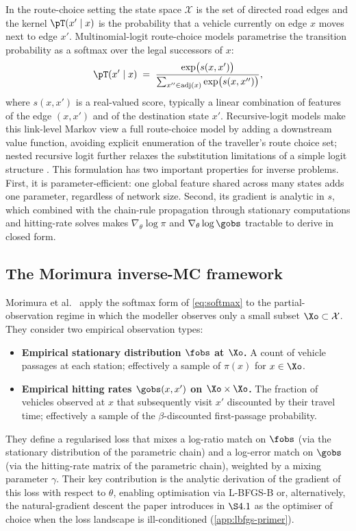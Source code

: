 In the route-choice setting the state space $\mathcal{X}$ is the set of
directed road edges and the kernel
$\pT(x'\mid x)$ is the probability that a vehicle currently on edge $x$
moves next to edge $x'$. Multinomial-logit route-choice models
\cite{ben-akiva1985, frejinger2007} parametrise the transition
probability as a softmax over the legal successors of $x$:
\begin{equation}
\pT(x'\mid x) \;=\;
\frac{\exp\bigl(s(x, x')\bigr)}{\sum_{x'' \in \mathrm{adj}(x)} \exp\bigl(s(x, x'')\bigr)},
\label{eq:softmax}
\end{equation}
where $s(x, x')$ is a real-valued score, typically a linear combination
of features of the edge $(x, x')$ and of the destination state $x'$.
Recursive-logit models make this link-level Markov view a full
route-choice model by adding a downstream value function, avoiding
explicit enumeration of the traveller's route choice set; nested
recursive logit further relaxes the substitution limitations of a
simple logit structure \cite{fosgerau2013route, mai2015nested}.
This formulation has two important properties for inverse problems.
First, it is parameter-efficient: one global feature shared across
many states adds one parameter, regardless of network size. Second, its
gradient is analytic in $s$, which combined with the chain-rule
propagation through stationary computations and hitting-rate solves makes
$\nabla_\theta \log \pi$ and $\nabla_\theta \log \gobs$ tractable to
derive in closed form.

\subsection{The Morimura inverse-MC framework}
\label{sec:morimura}

Morimura et al.~\cite{morimura2013} apply the softmax form of \cref{eq:softmax} to the
partial-observation regime in which the modeller observes only a
small subset $\Xo \subset \mathcal{X}$. They consider two empirical
observation types:
\begin{itemize}
\item \textbf{Empirical stationary distribution $\fobs$ at $\Xo$.}
A count of vehicle passages at each station; effectively a sample of
$\pi(x)$ for $x \in \Xo$.
\item \textbf{Empirical hitting rates $\gobs(x, x')$ on $\Xo \times \Xo$.}
The fraction of vehicles observed at $x$ that subsequently visit $x'$
discounted by their travel time; effectively a sample of the
$\beta$-discounted first-passage probability.
\end{itemize}
They define a regularised loss that mixes a log-ratio match on $\fobs$
(via the stationary distribution of the parametric chain) and a log-error
match on $\gobs$ (via the hitting-rate matrix of the parametric chain),
weighted by a mixing parameter $\gamma$. Their key contribution is the
analytic derivation of the gradient of this loss with respect to
$\theta$, enabling optimisation via L-BFGS-B or, alternatively, the
natural-gradient descent the paper introduces in $\S 4.1$ as the
optimiser of choice when the loss landscape is ill-conditioned
(\cref{app:lbfgs-primer}).

